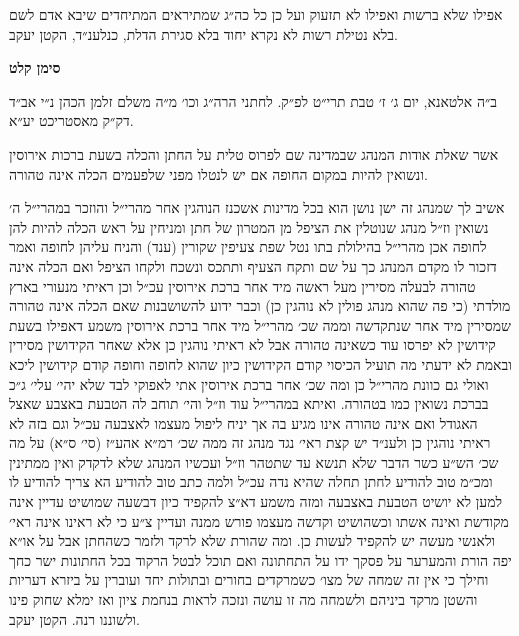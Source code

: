 \documentclass[12pt, openany]{book}
\newcommand{\chapname}{}
\newcommand{\newchap}[1]{
	\addcontentsline{toc}{chapter}{#1}
	\renewcommand{\chapname}{#1}
		\begin{center}
			\textbf{%
\fontsize{16pt}{16pt}\selectfont
				#1}
		\end{center}
}
\begin{document}
\begin{multicols}{2}
אפילו שלא ברשות ואפילו לא תזעוק ועל כן כל כה״ג שמתיראים המתיחדים שיבא אדם לשם בלא נטילת רשות לא נקרא יחוד בלא סגירת הדלת, כנלענ״ד, הקטן יעקב.\\\vspace{0pt}

\end{multicols}\newpage

\newchap{סימן קלט}
\begin{multicols}{2}
ב״ה אלטאנא, יום ג׳ ז׳ טבת תרי״ט לפ״ק. לחתני הרה״ג וכו׳ מ״ה משלם זלמן הכהן נ״י אב״ד דק״ק מאסטריכט יע״א.\\\vspace{0pt}

אשר שאלת אודות המנהג שבמדינה שם לפרוס טלית על החתן והכלה בשעת ברכות אירוסין ונשואין להיות במקום החופה אם יש לנטלו מפני שלפעמים הכלה אינה טהורה.\\\vspace{0pt}

אשיב לך שמנהג זה ישן נושן הוא בכל מדינות אשכנז הנוהגין אחר מהרי״ל והוזכר במהרי״ל ה׳ נשואין וז״ל מנהג שנוטלין את הציפל מן המטרון של חתן ומניחין על ראש הכלה להיות להן לחופה אכן מהרי״ל בהילולת בתו נטל שפת צעיפין שקורין (ענד) והניח עליהן לחופה ואמר דזכור לו מקדם המנהג כך על שם ותקח הצעיף ותתכס ונשכח ולקחו הציפל ואם הכלה אינה טהורה לבעלה מסירין מעל ראשה מיד אחר ברכת אירוסין עכ״ל וכן ראיתי מנעורי בארץ מולדתי (כי פה שהוא מנהג פולין לא נוהגין כן) וכבר ידוע להשושבנות שאם הכלה אינה טהורה שמסירין מיד אחר שנתקדשה וממה שכ׳ מהרי״ל מיד אחר ברכת אירוסין משמע דאפילו בשעת קידושין לא יפרסו עוד כשאינה טהורה אבל לא ראיתי נוהגין כן אלא שאחר הקידושין מסירין ובאמת לא ידעתי מה תועיל הכיסוי קודם הקידושין כיון שהוא לחופה וחופה קודם קידושין ליכא ואולי גם כוונת מהרי״ל כן ומה שכ׳ אחר ברכת אירוסין אתי לאפוקי לבד שלא יהי׳ עלי׳ ג״כ בברכת נשואין כמו בטהורה. ואיתא במהרי״ל עוד וז״ל והי׳ תוחב לה הטבעת באצבע שאצל האגודל ואם אינה טהורה אינו מגיע בה אך יניח ליפול מעצמו לאצבעה עכ״ל וגם בזה לא ראיתי נוהגין כן ולענ״ד יש קצת ראי׳ נגד מנהג זה ממה שכ׳ רמ״א אהע״ז (סי׳ ס״א) על מה שכ׳ הש״ע כשר הדבר שלא תנשא עד שתטהר וז״ל ועכשיו המנהג שלא לדקדק ואין ממתינין ומכ״מ טוב להודיע לחתן תחלה שהיא נדה עכ״ל ולמה כתב טוב להודיע הא צריך להודיע לו למען לא יושיט הטבעת באצבעה ומזה משמע דא״צ להקפיד כיון דבשעה שמושיט עדיין אינה מקודשת ואינה אשתו וכשהושיט וקדשה מעצמו פורש ממנה ועדיין צ״ע כי לא ראינו אינה ראי׳ ולאנשי מעשה יש להקפיד לעשות כן. ומה שהורת שלא לרקד ולזמר כשהחתן אבל על או״א יפה הורת והמערער על פסקך ידו על התחתונה ואם תוכל לבטל הרקוד בכל החתונות ישר כחך וחילך כי אין זה שמחה של מצו׳ כשמרקדים בחורים ובתולות יחד ועוברין על ביזרא דעריות והשטן מרקד ביניהם ולשמחה מה זו עושה ונזכה לראות בנחמת ציון ואז ימלא שחוק פינו ולשוננו רנה. הקטן יעקב.\\\vspace{0pt}

\end{multicols}\newpage
\end{document}
